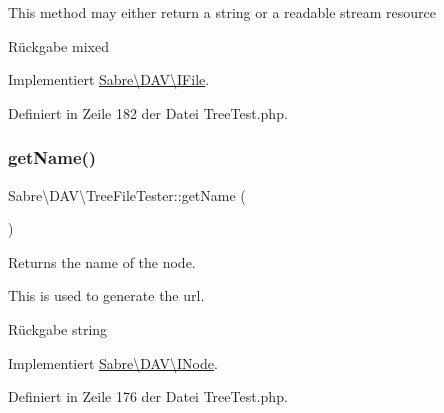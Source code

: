 This method may either return a string or a readable stream resource

\begin{DoxyReturn}{Rückgabe}
mixed 
\end{DoxyReturn}


Implementiert \mbox{\hyperlink{interface_sabre_1_1_d_a_v_1_1_i_file_a3102812af0567c3cfd9cd6c20104bd27}{Sabre\textbackslash{}\+D\+A\+V\textbackslash{}\+I\+File}}.



Definiert in Zeile 182 der Datei Tree\+Test.\+php.

\mbox{\label{class_sabre_1_1_d_a_v_1_1_tree_file_tester_a19625a861e0ecb02a986f61d3e097075}} 
\subsubsection{\texorpdfstring{get\+Name()}{getName()}}
{\footnotesize\ttfamily Sabre\textbackslash{}\+D\+A\+V\textbackslash{}\+Tree\+File\+Tester\+::get\+Name (\begin{DoxyParamCaption}{ }\end{DoxyParamCaption})}

Returns the name of the node.

This is used to generate the url.

\begin{DoxyReturn}{Rückgabe}
string 
\end{DoxyReturn}


Implementiert \mbox{\hyperlink{interface_sabre_1_1_d_a_v_1_1_i_node_ab616fe836b1ae36af12126a2bc934dce}{Sabre\textbackslash{}\+D\+A\+V\textbackslash{}\+I\+Node}}.



Definiert in Zeile 176 der Datei Tree\+Test.\+php.

\mbox{\label{class_sabre_1_1_d_a_v_1_1_tree_file_tester_a5339786bcd3f76824b00e09f0261036e}} 
